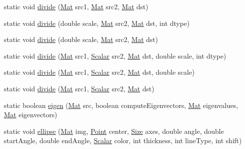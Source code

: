 \begin{DoxyCompactItemize}
\item 
static void \mbox{\hyperlink{classorg_1_1opencv_1_1core_1_1_core_a7fb1d61ed82296b38b4e5a2a15d0bb8e}{divide}} (\mbox{\hyperlink{classorg_1_1opencv_1_1core_1_1_mat}{Mat}} src1, \mbox{\hyperlink{classorg_1_1opencv_1_1core_1_1_mat}{Mat}} src2, \mbox{\hyperlink{classorg_1_1opencv_1_1core_1_1_mat}{Mat}} dst)
\item 
static void \mbox{\hyperlink{classorg_1_1opencv_1_1core_1_1_core_a72e29fcc15a837f2f76e2cc2c8429f06}{divide}} (double scale, \mbox{\hyperlink{classorg_1_1opencv_1_1core_1_1_mat}{Mat}} src2, \mbox{\hyperlink{classorg_1_1opencv_1_1core_1_1_mat}{Mat}} dst, int dtype)
\item 
static void \mbox{\hyperlink{classorg_1_1opencv_1_1core_1_1_core_a1600c192648e1f09e86b9b7ae8d6ea82}{divide}} (double scale, \mbox{\hyperlink{classorg_1_1opencv_1_1core_1_1_mat}{Mat}} src2, \mbox{\hyperlink{classorg_1_1opencv_1_1core_1_1_mat}{Mat}} dst)
\item 
static void \mbox{\hyperlink{classorg_1_1opencv_1_1core_1_1_core_ae4f6a61347c1af3819e65925d34f0d45}{divide}} (\mbox{\hyperlink{classorg_1_1opencv_1_1core_1_1_mat}{Mat}} src1, \mbox{\hyperlink{classorg_1_1opencv_1_1core_1_1_scalar}{Scalar}} src2, \mbox{\hyperlink{classorg_1_1opencv_1_1core_1_1_mat}{Mat}} dst, double scale, int dtype)
\item 
static void \mbox{\hyperlink{classorg_1_1opencv_1_1core_1_1_core_ae25ecaef7b81165a9700c04ca6a14ad8}{divide}} (\mbox{\hyperlink{classorg_1_1opencv_1_1core_1_1_mat}{Mat}} src1, \mbox{\hyperlink{classorg_1_1opencv_1_1core_1_1_scalar}{Scalar}} src2, \mbox{\hyperlink{classorg_1_1opencv_1_1core_1_1_mat}{Mat}} dst, double scale)
\item 
static void \mbox{\hyperlink{classorg_1_1opencv_1_1core_1_1_core_aee28f9ac9f6b8cb02b05f34007cf84bc}{divide}} (\mbox{\hyperlink{classorg_1_1opencv_1_1core_1_1_mat}{Mat}} src1, \mbox{\hyperlink{classorg_1_1opencv_1_1core_1_1_scalar}{Scalar}} src2, \mbox{\hyperlink{classorg_1_1opencv_1_1core_1_1_mat}{Mat}} dst)
\item 
static boolean \mbox{\hyperlink{classorg_1_1opencv_1_1core_1_1_core_ab44f09e696b045957316b9b384ef0c70}{eigen}} (\mbox{\hyperlink{classorg_1_1opencv_1_1core_1_1_mat}{Mat}} src, boolean compute\+Eigenvectors, \mbox{\hyperlink{classorg_1_1opencv_1_1core_1_1_mat}{Mat}} eigenvalues, \mbox{\hyperlink{classorg_1_1opencv_1_1core_1_1_mat}{Mat}} eigenvectors)
\item 
static void \mbox{\hyperlink{classorg_1_1opencv_1_1core_1_1_core_a3ef54117896a561685fd30cd374c2ce6}{ellipse}} (\mbox{\hyperlink{classorg_1_1opencv_1_1core_1_1_mat}{Mat}} img, \mbox{\hyperlink{classorg_1_1opencv_1_1core_1_1_point}{Point}} center, \mbox{\hyperlink{classorg_1_1opencv_1_1core_1_1_size}{Size}} axes, double angle, double start\+Angle, double end\+Angle, \mbox{\hyperlink{classorg_1_1opencv_1_1core_1_1_scalar}{Scalar}} color, int thickness, int line\+Type, int shift)

\end{DoxyCompactItemize}
